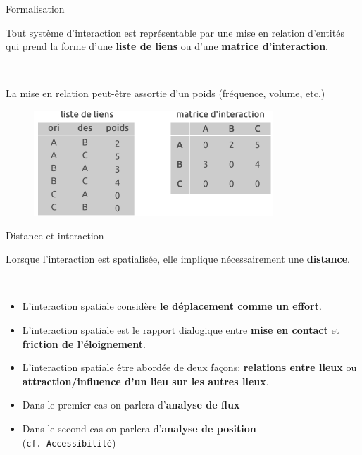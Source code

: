 \begin{frame}{Formalisation}

Tout système d'interaction est représentable par une mise en relation d'entités qui prend la forme d'une \textbf{liste de liens} ou d'une \textbf{matrice d'interaction}.

~

La mise en relation peut-être assortie d'un poids (fréquence, volume, etc.)

\begin{figure}
  \includegraphics[width=9cm]{MatriceOD.pdf}
\end{figure}

\end{frame}



\begin{frame}{Distance et interaction}

Lorsque l'interaction est spatialisée, elle implique nécessairement une \textbf{distance}.

~

\begin{itemize}
  \item L'interaction spatiale considère \textbf{le déplacement comme un effort}.
  \item L'interaction spatiale est le rapport dialogique entre \textbf{mise en contact} et \textbf{friction de l'éloignement}.
  \item L'interaction spatiale être abordée de deux façons: \textbf{relations entre lieux}  ou \textbf{attraction/influence d'un lieu sur les autres lieux}. 
  \item Dans le premier cas on parlera d'\textbf{analyse de flux}
  \item Dans le second cas on parlera d'\textbf{analyse de position} \\ (\texttt{cf. Accessibilité})
\end{itemize}

\end{frame}


